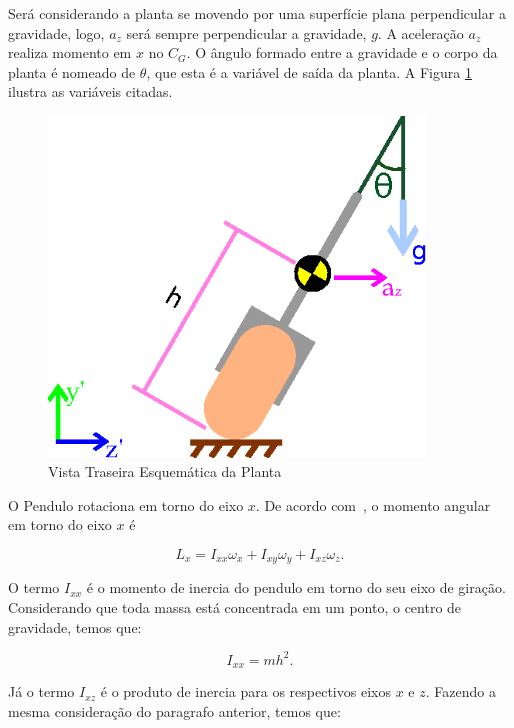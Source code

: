         Será considerando a planta se movendo por uma superfície plana perpendicular a gravidade, logo, $a_z$ será sempre perpendicular a gravidade, $g$. A aceleração $a_z$ realiza momento em $x$ no $C_G$. O ângulo formado entre a gravidade e o corpo da planta é nomeado de $\theta$, que esta é a variável de saída da planta. A Figura \ref{img:VistaTraseiraEsquematica} ilustra as variáveis citadas.
        
        \begin{figure}[h]
            \centering
            \includegraphics[width=10cm]{Imagens/theta.eps}
            \caption{Vista Traseira Esquemática da Planta}
            \label{img:VistaTraseiraEsquematica}
        \end{figure}
        
        O Pendulo rotaciona em torno do eixo $x$. De acordo com~\cite{book:goldstein}, o momento angular em torno do eixo $x$ é
        
        \begin{equation}
            L_x = I_{xx}\omega_x + I_{xy}\omega_y + I_{xz}\omega_z.
            \label{MomentoAngularOriginal}
        \end{equation}
        
        O termo $I_{xx}$ é o momento de inercia do pendulo em torno do seu eixo de giração. Considerando que toda massa está concentrada em um ponto, o centro de gravidade, temos que:
        
        \begin{equation}
            I_{xx} = mh^2.
        \end{equation}
        
        Já o termo $I_{xz}$ é o produto de inercia para os respectivos eixos $x$ e $z$. Fazendo a mesma consideração do paragrafo anterior, temos que:
        
